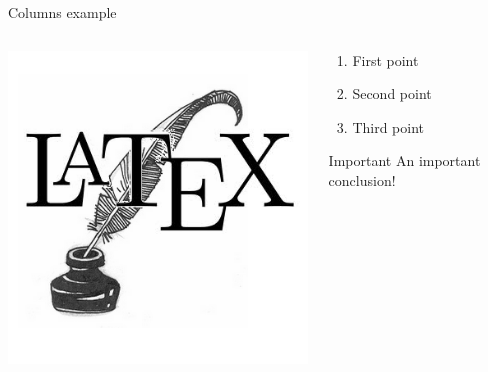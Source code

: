 \documentclass[10pt, aspectratio=169]{beamer}
\begin{document}
\begin{frame}{Columns example}

\begin{columns}
\begin{column}[c]{0.5\textwidth}
\centering\includegraphics[width=0.8\hsize]{example}
\end{column}

\begin{column}[c]{0.5\textwidth}
\begin{enumerate}
\item First point
\item Second point
\item Third point
\end{enumerate}

\begin{block}{Important}
An important conclusion!
\end{block}
\end{column}
\end{columns}

\end{frame}
\end{document}
